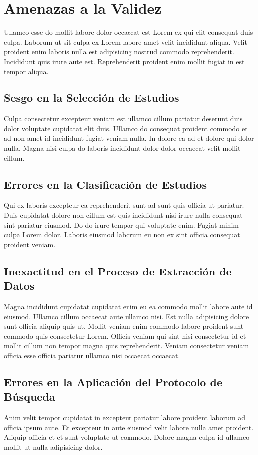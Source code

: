 \section{Amenazas a la Validez}
Ullamco esse do mollit labore dolor occaecat est Lorem ex qui elit consequat duis culpa. Laborum ut sit culpa ex Lorem labore amet velit incididunt aliqua. Velit proident enim laboris nulla est adipisicing nostrud commodo reprehenderit. Incididunt quis irure aute est. Reprehenderit proident enim mollit fugiat in est tempor aliqua.


\subsection{Sesgo en la Selección de Estudios}
Culpa consectetur excepteur veniam est ullamco cillum pariatur deserunt duis dolor voluptate cupidatat elit duis. Ullamco do consequat proident commodo et ad non amet id incididunt fugiat veniam nulla. In dolore ea ad et dolore qui dolor nulla. Magna nisi culpa do laboris incididunt dolor dolor occaecat velit mollit cillum.

\subsection{Errores en la Clasificación de Estudios}
Qui ex laboris excepteur ea reprehenderit sunt ad sunt quis officia ut pariatur. Duis cupidatat dolore non cillum est quis incididunt nisi irure nulla consequat sint pariatur eiusmod. Do do irure tempor qui voluptate enim. Fugiat minim culpa Lorem dolor. Laboris eiusmod laborum eu non ex sint officia consequat proident veniam.
    
\subsection{Inexactitud en el Proceso de Extracción de Datos}
Magna incididunt cupidatat cupidatat enim eu ea commodo mollit labore aute id eiusmod. Ullamco cillum occaecat aute ullamco nisi. Est nulla adipisicing dolore sunt officia aliquip quis ut. Mollit veniam enim commodo labore proident sunt commodo quis consectetur Lorem. Officia veniam qui sint nisi consectetur id et mollit cillum non tempor magna quis reprehenderit. Veniam consectetur veniam officia esse officia pariatur ullamco nisi occaecat occaecat.

\subsection{Errores en la Aplicación del Protocolo de Búsqueda}
Anim velit tempor cupidatat in excepteur pariatur labore proident laborum ad officia ipsum aute. Et excepteur in aute eiusmod velit labore nulla amet proident. Aliquip officia et et sunt voluptate ut commodo. Dolore magna culpa id ullamco mollit ut nulla adipisicing dolor.

